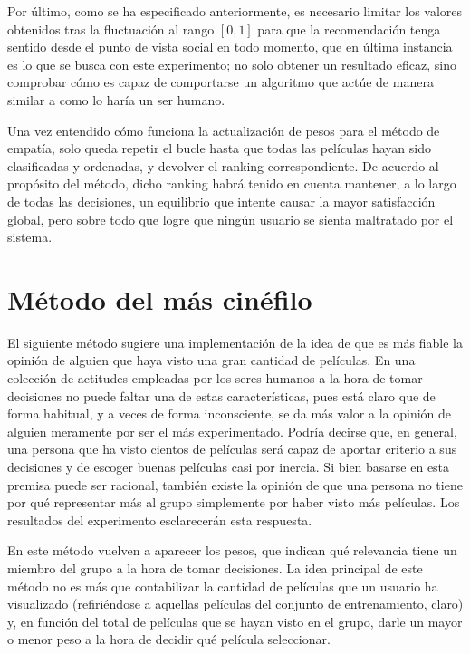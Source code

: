 Por último, como se ha especificado anteriormente, es necesario limitar los valores obtenidos tras la fluctuación al rango $[0,1]$ para que la recomendación tenga sentido desde el punto de vista social en todo momento, que en última instancia es lo que se busca con este experimento; no solo obtener un resultado eficaz, sino comprobar cómo es capaz de comportarse un algoritmo que actúe de manera similar a como lo haría un ser humano.

Una vez entendido cómo funciona la actualización de pesos para el método de empatía, solo queda repetir el bucle hasta que todas las películas hayan sido clasificadas y ordenadas, y devolver el ranking correspondiente. De acuerdo al propósito del método, dicho ranking habrá tenido en cuenta mantener, a lo largo de todas las decisiones, un equilibrio que intente causar la mayor satisfacción global, pero sobre todo que logre que ningún usuario se sienta maltratado por el sistema.

\section{Método del más cinéfilo}

El siguiente método sugiere una implementación de la idea de que es más fiable la opinión de alguien que haya visto una gran cantidad de películas. En una colección de actitudes empleadas por los seres humanos a la hora de tomar decisiones no puede faltar una de estas características, pues está claro que de forma habitual, y a veces de forma inconsciente, se da más valor a la opinión de alguien meramente por ser el más experimentado. Podría decirse que, en general, una persona que ha visto cientos de películas será capaz de aportar criterio a sus decisiones y de escoger buenas películas casi por inercia. Si bien basarse en esta premisa puede ser racional, también existe la opinión de que una persona no tiene por qué representar más al grupo simplemente por haber visto más películas. Los resultados del experimento esclarecerán esta respuesta.

En este método vuelven a aparecer los pesos, que indican qué relevancia tiene un miembro del grupo a la hora de tomar decisiones. La idea principal de este método no es más que contabilizar la cantidad de películas que un usuario ha visualizado (refiriéndose a aquellas películas del conjunto de entrenamiento, claro) y, en función del total de películas que se hayan visto en el grupo, darle un mayor o menor peso a la hora de decidir qué película seleccionar.

